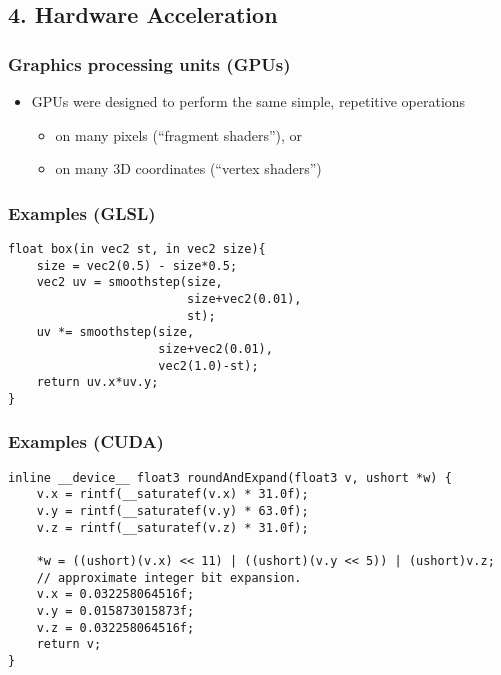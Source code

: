 \documentclass[12pt]{article}
\begin{document}
\subsection{4. Hardware Acceleration}
\subsubsection{Graphics processing units (GPUs)}

\begin{itemize}
  \item GPUs were designed to perform the same simple, repetitive operations
  \begin{itemize}
      \item on many pixels (``fragment shaders''), or
      \item on many 3D coordinates (``vertex shaders'')
  \end{itemize}
\end{itemize}

\subsubsection{Examples (GLSL)}

\begin{lstlisting}
float box(in vec2 st, in vec2 size){
    size = vec2(0.5) - size*0.5;
    vec2 uv = smoothstep(size,
                         size+vec2(0.01),
                         st);
    uv *= smoothstep(size,
                     size+vec2(0.01),
                     vec2(1.0)-st);
    return uv.x*uv.y;
}
\end{lstlisting}


\subsubsection{Examples (CUDA)}

\begin{lstlisting}
inline __device__ float3 roundAndExpand(float3 v, ushort *w) {
    v.x = rintf(__saturatef(v.x) * 31.0f);
    v.y = rintf(__saturatef(v.y) * 63.0f);
    v.z = rintf(__saturatef(v.z) * 31.0f);
    
    *w = ((ushort)(v.x) << 11) | ((ushort)(v.y << 5)) | (ushort)v.z;
    // approximate integer bit expansion.
    v.x = 0.032258064516f;
    v.y = 0.015873015873f;
    v.z = 0.032258064516f;
    return v;
}
\end{lstlisting}
\end{document}

